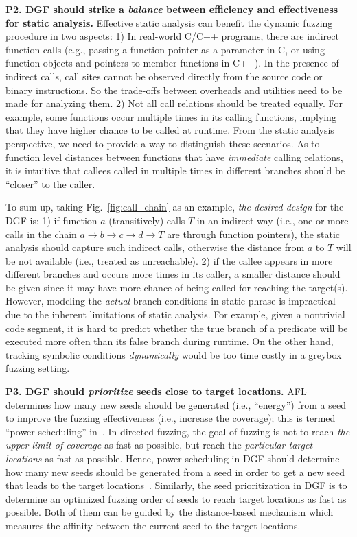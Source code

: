 \textbf{P2. DGF should strike a \emph{balance} between efficiency and effectiveness for static analysis.}
Effective static analysis can benefit the dynamic fuzzing procedure in two aspects: 1) In real-world C/C++ programs, there are indirect function calls (e.g., passing a function pointer as a parameter in C, or using function objects and pointers to member functions in C++). In the presence of indirect calls, call sites cannot be observed directly from the source code or binary instructions. So the trade-offs between overheads and utilities need to be made for analyzing them. 2) Not all call relations should be treated equally. For example, some functions occur multiple times in its calling functions, implying  that they have higher chance to be called at runtime. From the static analysis perspective, we need to provide a way to distinguish these scenarios. As to function level distances between functions that have \emph{immediate} calling relations, it is intuitive that callees called in multiple times in different branches should be ``closer'' to the caller.


To sum up, taking Fig.~\ref{fig:call_chain} as an example, \emph{the desired design} for the DGF is: 1) if function $a$ (transitively) calls $T$ in an indirect way (i.e., one or more calls in the chain $a\rightarrow\! b\!\rightarrow\! c\!\rightarrow\! d\!\rightarrow\! T$ are through function pointers), the static analysis should capture such indirect calls, otherwise the distance from $a$ to $T$ will be not available (i.e., treated as unreachable). 2) if the callee appears in more different branches and occurs more times in its caller, a smaller distance should be given since it may have more chance of being called for reaching the target(s). However, modeling the \emph{actual} branch conditions in static phrase is impractical due to the inherent limitations of static analysis. For example, given a nontrivial code segment, it is hard to predict whether the true branch of a predicate will be executed more often than its false branch during runtime. On the other hand, tracking symbolic conditions \emph{dynamically} would be too time costly in a greybox fuzzing setting.

\textbf{P3. DGF should \emph{prioritize} seeds close to target locations.}
 AFL determines how many new seeds should be generated (i.e., ``energy'') from a seed to improve the fuzzing effectiveness (i.e., increase the coverage); this is termed ``power scheduling'' in~\cite{Bohme:2016:CGF,Bohme:2017:DGF}. In directed fuzzing, the goal of fuzzing is not to reach \emph{the upper-limit of coverage} as fast as possible, but reach the \emph{particular target locations} as fast as possible. Hence, power scheduling in DGF should determine how many new seeds should be generated from a seed in order to get a new seed that leads to the target locations~\cite{Bohme:2017:DGF}. Similarly, the seed prioritization in DGF is to determine an optimized fuzzing order of seeds to reach target locations as fast as possible. Both of them can be guided by the distance-based mechanism which measures the affinity between the current seed to the target locations. 
 
